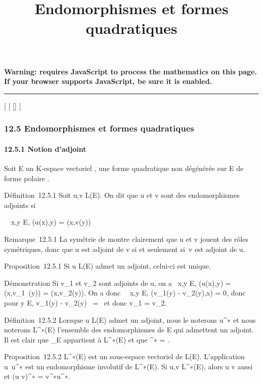 \documentclass[]{article}
\title{Endomorphismes et formes quadratiques}
\author{}
\date{}
\begin{document}
\maketitle

\textbf{Warning: 
requires JavaScript to process the mathematics on this page.\\ If your
browser supports JavaScript, be sure it is enabled.}

\begin{center}\rule{3in}{0.4pt}\end{center}

[
[
[]
[

\subsubsection{12.5 Endomorphismes et formes quadratiques}

\paragraph{12.5.1 Notion d'adjoint}

Soit E un K-espace vectoriel , \Phi une forme quadratique non dégénérée sur
E de forme polaire \phi.

Définition~12.5.1 Soit u,v \in L(E). On dit que u et v sont des
endomorphismes adjoints si

\forall~~x,y \in E, \phi(u(x),y) = \phi(x,v(y))

Remarque~12.5.1 La symétrie de \phi montre clairement que u et v jouent des
rôles symétriques, donc que u est adjoint de v si et seulement si~v est
adjoint de u.

Proposition~12.5.1 Si u \in L(E) admet un adjoint, celui-ci est unique.

Démonstration Si v_1 et v_2 sont adjoints de u, on a
\forall~x,y \in E, \phi(u(x),y) = \phi(x,v_1~(y)) =
\phi(x,v_2(y)). On a donc \forall~~x,y \in E,
\phi(v_1(y) - v_2(y),x) = 0, donc pour y \in E,
v_1(y) - v_2(y)
\in\mathrmKer~\phi =
\0\ et donc v_1 =
v_2.

Définition~12.5.2 Lorsque u \in L(E) admet un adjoint, nous le noterons
u^∗ et nous noterons L^∗(E) l'ensemble des
endomorphismes de E qui admettent un adjoint. Il est clair que
\mathrmId_E appartient à L^∗(E)
et que \mathrmId^∗ =
\mathrmId.

Proposition~12.5.2 L^∗(E) est un sous-espace vectoriel de
L(E). L'application u\mapsto~u^∗ est un
endomorphisme involutif de L^∗(E). Si u,v \in
L^∗(E), alors u \cdot v aussi et (u \cdot v)^∗ =
v^∗\cdot u^∗.
\end{document}
